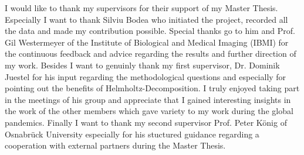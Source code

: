 \documentclass[
11pt, %
oneside, %
english, %
singlespacing, %
parskip, %
headsepline, %
]{MastersDoctoralThesis} %
\begin{document}
\begin{acknowledgements}
\addchaptertocentry{\acknowledgementname} %
I would like to thank my supervisors for their support of my Master Thesis. Especially I want to thank Silviu Bodea who initiated the project, recorded all the data and made my contribution possible. Special thanks go to him and Prof. Gil Westermeyer of the Institute of Biological and Medical Imaging (IBMI) for the continuous feedback and advice regarding the results and further direction of my work. Besides I want to genuinly thank my first supervisor, Dr. Dominik Juestel for his input regarding the methodological questions and especially for pointing out the benefits of Helmholtz-Decomposition. I truly enjoyed taking part in the meetings of his group and appreciate that I gained interesting insights in the work of the other members which gave variety to my work during the global pandemics. Finally I want to thank my second supervisor Prof. Peter König of Osnabrück University especially for his stuctured guidance regarding a cooperation with external partners during the Master Thesis.
\end{acknowledgements}


\tableofcontents %

\listoffigures %


\end{document}
